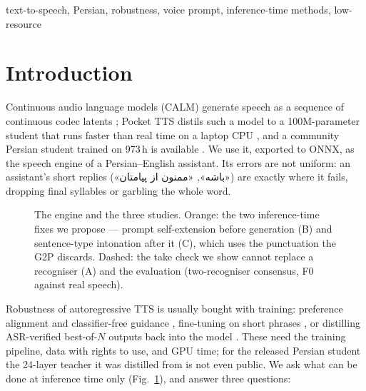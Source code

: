 \documentclass[conference]{IEEEtran}
\newcommand{\fa}[1]{{\persianfont\beginR #1\endR}}
\begin{document}
\begin{IEEEkeywords}
text-to-speech, Persian, robustness, voice prompt, inference-time methods, low-resource
\end{IEEEkeywords}

\section{Introduction}
Continuous audio language models (CALM) generate speech as a sequence of continuous codec latents
\cite{calm2025}; Pocket TTS distils such a model to a 100M-parameter student that runs faster than real
time on a laptop CPU \cite{pockettts2026}, and a community Persian student trained on 973\,h is available
\cite{farsiv2}. We use it, exported to ONNX, as the speech engine of a Persian--English assistant. Its
errors are not uniform: an assistant's short replies (\fa{«باشه»}, \fa{«ممنون از پیامتان»}) are exactly where it fails,
dropping final syllables or garbling the whole word.

\begin{figure}[t]
\centering

\caption{The engine and the three studies. Orange: the two inference-time fixes we propose --- prompt
self-extension before generation (B) and sentence-type intonation after it (C), which uses the
punctuation the G2P discards. Dashed: the take check we show cannot replace a recogniser (A) and the
evaluation (two-recogniser consensus, F0 against real speech).}
\label{fig:pipeline}
\end{figure}

Robustness of autoregressive TTS is usually bought with training: preference alignment and classifier-free
guidance \cite{koel2025}, fine-tuning on short phrases \cite{gepard2026}, or distilling ASR-verified
best-of-$N$ outputs back into the model \cite{asaria2026}. These need the training pipeline, data with
rights to use, and GPU time; for the released Persian student the 24-layer teacher it was distilled from is
not even public. We ask what can be done at inference time only (Fig.~\ref{fig:pipeline}), and answer three questions:
\end{document}
